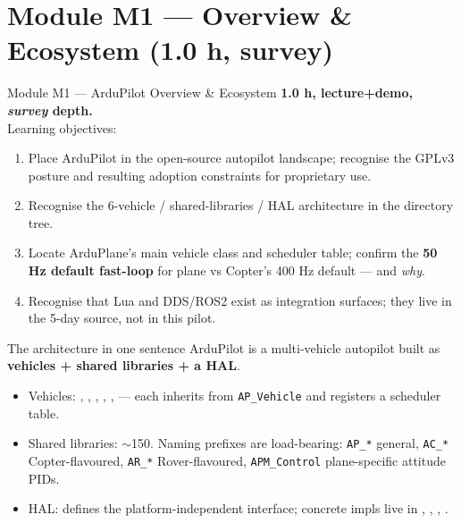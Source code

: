 \documentclass[aspectratio=169,11pt]{beamer}
\begin{document}
\section{Module M1 --- Overview \& Ecosystem (1.0 h, survey)}

\begin{frame}[allowframebreaks]{Module M1 --- ArduPilot Overview \& Ecosystem}
  \textbf{1.0 h, lecture+demo, \emph{survey} depth.}\\[1ex]
  Learning objectives:
  \begin{enumerate}
    \item Place ArduPilot in the open-source autopilot landscape; recognise the GPLv3 posture and resulting adoption constraints for proprietary use.
    \item Recognise the 6-vehicle / shared-libraries / HAL architecture in the directory tree.
    \item Locate ArduPlane's main vehicle class and scheduler table; confirm the \textbf{50 Hz default fast-loop} for plane vs Copter's 400 Hz default --- and \emph{why}.
    \item Recognise that Lua and DDS/ROS2 exist as integration surfaces; they live in the 5-day source, not in this pilot.
  \end{enumerate}
\end{frame}

\begin{frame}{The architecture in one sentence}
  ArduPilot is a multi-vehicle autopilot built as \textbf{vehicles + shared libraries + a HAL}.
  \vfill
  \begin{itemize}
    \item Vehicles: , , , , ,  --- each inherits from \texttt{AP\_Vehicle} and registers a scheduler table.
    \item Shared libraries: $\sim$150. Naming prefixes are load-bearing: \texttt{AP\_*} general, \texttt{AC\_*} Copter-flavoured, \texttt{AR\_*} Rover-flavoured, \texttt{APM\_Control} plane-specific attitude PIDs.
    \item HAL:  defines the platform-independent interface; concrete impls live in , , , .
  \end{itemize}
\end{frame}
\end{document}
